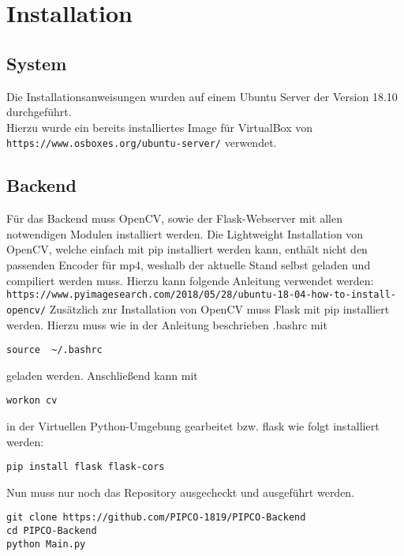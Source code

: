 \chapter{Installation}
\label{chapter_installation}

\section{System}
Die Installationsanweisungen wurden auf einem Ubuntu Server der Version 18.10 durchgeführt.\\
Hierzu wurde ein bereits installiertes Image für VirtualBox von \\ \texttt{https://www.osboxes.org/ubuntu-server/} verwendet.
  
\section{Backend}
Für das Backend muss OpenCV, sowie der Flask-Webserver mit allen notwendigen Modulen installiert werden.
Die Lightweight Installation von OpenCV, welche einfach mit pip installiert werden kann, enthält nicht den passenden Encoder für mp4, weshalb der aktuelle Stand selbst geladen und compiliert werden muss.
Hierzu kann folgende Anleitung verwendet werden:\\
\texttt{https://www.pyimagesearch.com/2018/05/28/ubuntu-18-04-how-to-install-opencv/}
Zusätzlich zur Installation von OpenCV muss Flask mit pip installiert werden.
Hierzu muss wie in der Anleitung beschrieben .bashrc mit 
\begin{lstlisting}[frame=single]
source  ~/.bashrc
\end{lstlisting}
geladen werden.
Anschließend kann mit
\begin{lstlisting}[frame=single]
workon cv
\end{lstlisting} in der Virtuellen Python-Umgebung gearbeitet bzw. flask wie folgt installiert werden:
\begin{lstlisting}[frame=single]
pip install flask flask-cors
\end{lstlisting}
Nun muss nur noch das Repository ausgecheckt und ausgeführt werden.
\begin{lstlisting}[frame=single]
git clone https://github.com/PIPCO-1819/PIPCO-Backend
cd PIPCO-Backend
python Main.py
\end{lstlisting}

